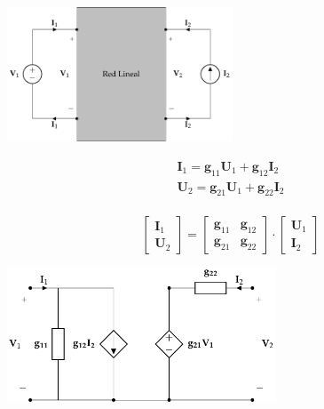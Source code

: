 \documentclass[10pt]{article}
\begin{document}
\begin{minipage}{0.5\textwidth}
  \begin{center}
    \includegraphics[height=4cm]{../figs/cuadripolo_hibrido_inverso.pdf}
  \end{center}
\end{minipage}
\begin{minipage}{0.5\textwidth}
  \[
    \begin{array}{l}
      \mathbf{I}_1 = \mathbf{g}_{11} \mathbf{U}_1 + \mathbf{g}_{12} \mathbf{I}_2\\
      \mathbf{U}_2 = \mathbf{g}_{21} \mathbf{U}_1 + \mathbf{g}_{22} \mathbf{I}_2\\
    \end{array}
  \]


  \[
    \left[
      \begin{array}{c}
        \mathbf{I}_1\\
        \mathbf{U}_2
      \end{array}
    \right] =
    \left[
      \begin{array}{cc}
        \mathbf{g}_{11} & \mathbf{g}_{12}\\
        \mathbf{g}_{21} & \mathbf{g}_{22}
      \end{array}
    \right] \cdot
    \left[
      \begin{array}{c}
        \mathbf{U}_1\\
        \mathbf{I}_2
      \end{array}
    \right]
  \]
\end{minipage}

\begin{center}
\includegraphics[height=4cm]{../figs/circuitoEquivalenteG.pdf}
\end{center}
\end{document}
